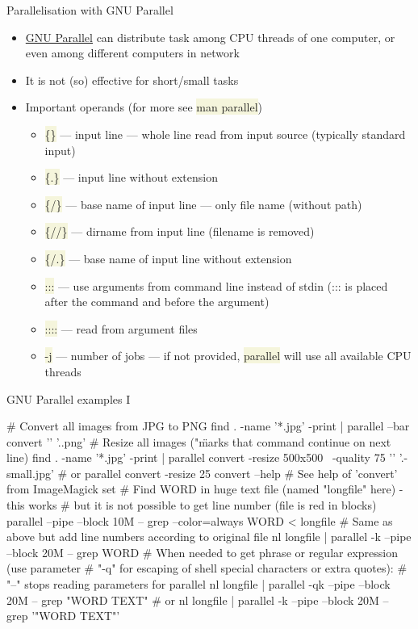 \documentclass[compress, ucs, xelatex, 11pt, xcolor=svgnames, aspectratio=169,
	hyperref={
		bookmarks=true,
		unicode=true,
		colorlinks=true,
		pdftitle={Linux, command line and MetaCentrum},
		plainpages=false,
		pdfauthor={Vojtech Zeisek},
		pdfsubject={Course about use of Linux command line, writing shell scripts and using MetaCentrum of CESNET},
		pdfcreator={XeLaTeX},
		pdfkeywords={Linux, GNU, BASH, shell, command line, MetaCentrum},
		linkcolor=DarkRed, %
		anchorcolor=DarkBlue, %
		citecolor=Indigo, %
		filecolor=NavyBlue, %
		menucolor=DarkMagenta, %
		urlcolor=DarkBlue, %
		pdftex},
	url={hyphens, lowtilde} %
	]{beamer}
\renewcommand{\texttt}[1]{\colorbox{Beige}{{\ttfamily #1}}}
\begin{document}
\begin{frame}{Parallelisation with GNU Parallel}
	\begin{itemize}
		\item \href{https://www.gnu.org/software/parallel/}{GNU Parallel} can distribute task among CPU threads of one computer, or even among different computers in network
		\item It is not (so) effective for short/small tasks
		\item Important operands (for more see \texttt{man parallel})
		\begin{itemize}
			\item \texttt{\{\}} --- input line --- whole line read from input source (typically standard input)
			\item \texttt{\{.\}} --- input line without extension
			\item \texttt{\{/\}} --- base name of input line --- only file name (without path)
			\item \texttt{\{//\}} --- dirname from input line (filename is removed)
			\item \texttt{\{/.\}} --- base name of input line without extension
			\item \texttt{:::} --- use arguments from command line instead of stdin (::: is placed after the command and before the argument)
			\item \texttt{::::} --- read from argument files
			\item \texttt{-j} --- number of jobs --- if not provided, \texttt{parallel} will use all available CPU threads
		\end{itemize}
	\end{itemize}
\end{frame}

\begin{frame}[fragile]{GNU Parallel examples I}
	\begin{bashcode}
    # Convert all images from JPG to PNG
    find . -name '*.jpg' -print | parallel --bar convert '{}' '{.}.png'
    # Resize all images ("\" marks that command continue on next line)
    find . -name '*.jpg' -print | parallel convert -resize 500x500 \
      -quality 75 '{}' '{.}-small.jpg' # or
    parallel convert -resize 25%
    convert --help # See help of 'convert' from ImageMagick set
    # Find WORD in huge text file (named "longfile" here) - this works
    # but it is not possible to get line number (file is red in blocks)
    parallel --pipe --block 10M -- grep --color=always WORD < longfile
    # Same as above but add line numbers according to original file
    nl longfile | parallel -k --pipe --block 20M -- grep WORD
    # When needed to get phrase or regular expression (use parameter
    # "-q" for escaping of shell special characters or extra quotes):
    # "--" stops reading parameters for parallel
    nl longfile | parallel -qk --pipe --block 20M -- grep "WORD TEXT" # or
    nl longfile | parallel -k --pipe --block 20M -- grep '"WORD TEXT"'
	\end{bashcode}
\end{frame}
\end{document}
